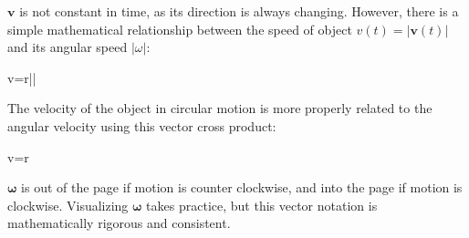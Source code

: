 $\bm v$ is not constant in time, as its direction is always changing. However,
there is a simple mathematical relationship between the speed of object
$v(t)=|\bm v(t)|$ and its angular speed $|\omega|$:
\begin{important-equation}
  v=r|\omega|
\end{important-equation}
  

The velocity of the object in circular motion is more properly related to
the angular velocity using this vector cross product:
\begin{important-equation}
  \bm v=\bm\omega\times\bm r
\end{important-equation}
$\bm\omega$ is out of the page if motion is counter clockwise, and into the page
if motion is clockwise. Visualizing $\bm\omega$ takes practice, but this vector
notation is mathematically rigorous and consistent.
  




%
%



